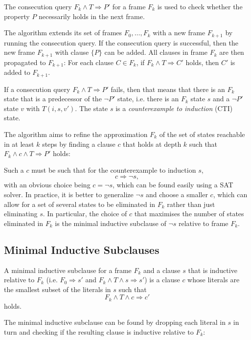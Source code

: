 \documentclass[12pt,a4paper,twoside,openright]{report}
\begin{document}
The consecution query $F_k \wedge T \Rightarrow P'$ for a frame $F_k$
is used to check whether the property $P$ necessarily holds in the next
frame.

The algorithm extends its set of frames $F_0,\ldots,F_k$ with a new frame
$F_{k + 1}$ by running the consecution query.
If the consecution query is successful, then the new frame $F_{k + 1}$
with clause $\{P\}$ can be added.
All clauses in frame $F_k$ are then propagated to $F_{k + 1}$:
For each clause $C \in F_k$, if $F_k \wedge T \Rightarrow C'$ holds, then $C'$
is added to $F_{k + 1}$.

If a consecution query $F_k \wedge T \Rightarrow P'$ fails, then that means that
there is an $F_k$ state that is a predecessor of the $\neg P'$ state,
i.e. there is an $F_k$ state $s$ and a $\neg P'$ state $v$ with $T(i,s,v')$.
The state
$s$ is a \emph{counterexample to induction} (CTI) state.

The algorithm aims to refine the approximation $F_k$ of the set of states
reachable in at least $k$ steps
by finding a clause $c$ that holds at depth $k$ such that
$F_k \wedge c \wedge T \Rightarrow P'$ holds:

Such a $c$ must be such that for the counterexample to induction $s$,
$$c \Rightarrow \neg s,$$
with an obvious choice being $c = \neg s$, which can be found easily using
a SAT solver. In practice, it is better to generalize $\neg s$ and choose
a smaller $c$,
which can allow for a set of several states to be eliminated in $F_k$
rather than just eliminating $s$. In particular, the choice of $c$ that
maximises the number of states eliminated in $F_k$ is the minimal
inductive subclause of $\neg s$ relative to frame $F_k$.

\subsection{Minimal Inductive Subclauses}
A minimal inductive subclause for a frame $F_k$ and a clause $s$ that
is inductive relative to $F_k$
(i.e. $F_0 \Rightarrow s'$ and $F_k \wedge T \wedge s \Rightarrow s'$)
is a clause $c$ whose
literals are the smallest subset of the literals in $s$ such that
$$F_k \wedge T \wedge c \Rightarrow c'$$
holds.

The minimal inductive subclause can be found by dropping each literal
in $s$ in turn and checking if the resulting clause is inductive
relative to $F_k$:
\end{document}
